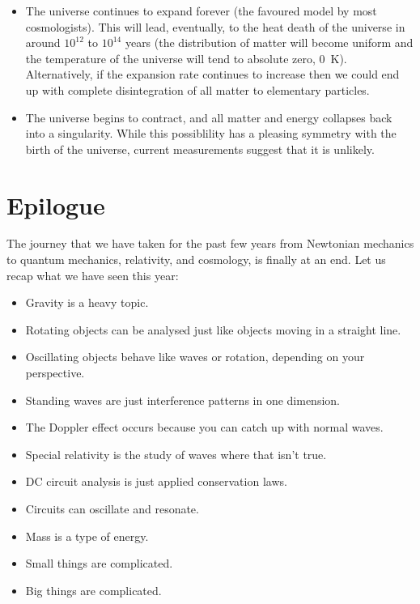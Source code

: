 \documentclass[a4paper]{amsbook}
\theoremstyle{definition}
\numberwithin{exercise}{chapter}
\numberwithin{exercise}{chapter}
\begin{document}
\begin{itemize}
  \item The universe continues to expand forever (the favoured model by most cosmologists). This will lead, eventually, to the heat death of the
        universe in around $ 10^{12} $ to $ 10^{14} $ years (the distribution of matter will become uniform and the temperature of the universe
        will tend to absolute zero, \SI{0}{\kelvin}). Alternatively, if the expansion rate continues to increase then we could end up with complete
        disintegration of all matter to elementary particles.
  \item The universe begins to contract, and all matter and energy collapses back into a singularity. While this possiblility has a pleasing
        symmetry with the birth of the universe, current measurements suggest that it is unlikely.
\end{itemize}

\chapter*{Epilogue}
The journey that we have taken for the past few years from Newtonian mechanics to quantum mechanics, relativity, and cosmology, is finally at an end. Let us
recap what we have seen this year:
\begin{itemize}
  \item Gravity is a heavy topic.
  \item Rotating objects can be analysed just like objects moving in a straight line.
  \item Oscillating objects behave like waves or rotation, depending on your perspective.
  \item Standing waves are just interference patterns in one dimension.
  \item The Doppler effect occurs because you can catch up with normal waves.
  \item Special relativity is the study of waves where that isn't true.
  \item DC circuit analysis is just applied conservation laws.
  \item Circuits can oscillate and resonate.
  \item Mass is a type of energy.
  \item Small things are complicated.
  \item Big things are complicated.
\end{itemize}
\end{document}
